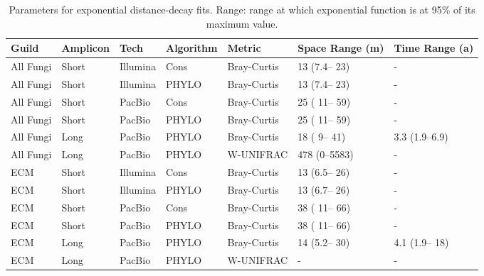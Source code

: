 \documentclass[
]{article}
\begin{document}
\begin{table}

\caption{\label{tab:variofit}Parameters for exponential distance-decay fits. Range: range at which exponential function is at 95\% of its maximum value.}
\centering
\begin{tabular}[t]{lllllll}
\toprule
Guild & Amplicon & Tech & Algorithm & Metric & Space Range (m) & Time Range (a)\\
\midrule
All Fungi & Short & Illumina & Cons & Bray-Curtis & 13 (7.4– 23) & -\\
All Fungi & Short & Illumina & PHYLO & Bray-Curtis & 13 (7.4– 23) & -\\
All Fungi & Short & PacBio & Cons & Bray-Curtis & 25 ( 11– 59) & -\\
All Fungi & Short & PacBio & PHYLO & Bray-Curtis & 25 ( 11– 59) & -\\
All Fungi & Long & PacBio & PHYLO & Bray-Curtis & 18 (  9– 41) & 3.3 (1.9–6.9)\\
All Fungi & Long & PacBio & PHYLO & W-UNIFRAC & 478 (0–5583) & -\\
\addlinespace
ECM & Short & Illumina & Cons & Bray-Curtis & 13 (6.5– 26) & -\\
ECM & Short & Illumina & PHYLO & Bray-Curtis & 13 (6.7– 26) & -\\
ECM & Short & PacBio & Cons & Bray-Curtis & 38 ( 11– 66) & -\\
ECM & Short & PacBio & PHYLO & Bray-Curtis & 38 ( 11– 66) & -\\
ECM & Long & PacBio & PHYLO & Bray-Curtis & 14 (5.2– 30) & 4.1 (1.9– 18)\\
ECM & Long & PacBio & PHYLO & W-UNIFRAC & - & -\\
\bottomrule
\end{tabular}
\end{table}
\end{document}
